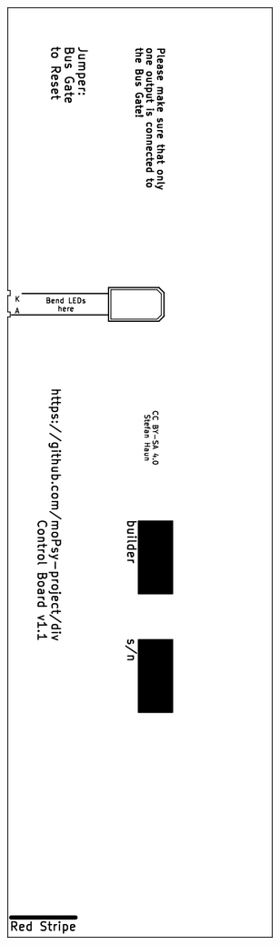 \documentclass[a4paper,
               11pt,
               parskip=half,
               headinclude,
               titlepage=false]{scrartcl}
\begin{document}
\begin{center}
\begin{minipage}{.35\linewidth}
\end{minipage}
\hspace{.1\linewidth}
\begin{minipage}{.35\linewidth}
  \includegraphics[width=\linewidth]{div-B_Silkscreen}
\end{minipage}
\end{center}
\end{document}
